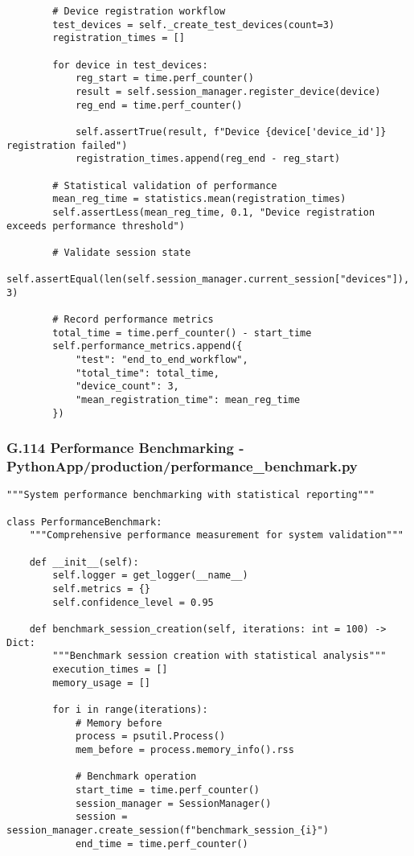 \documentclass[11pt,a4paper]{article}
\begin{document}
{{\begin{verbatim}
        # Device registration workflow
        test_devices = self._create_test_devices(count=3)
        registration_times = []

        for device in test_devices:
            reg_start = time.perf_counter()
            result = self.session_manager.register_device(device)
            reg_end = time.perf_counter()

            self.assertTrue(result, f"Device {device['device_id']} registration failed")
            registration_times.append(reg_end - reg_start)

        # Statistical validation of performance
        mean_reg_time = statistics.mean(registration_times)
        self.assertLess(mean_reg_time, 0.1, "Device registration exceeds performance threshold")

        # Validate session state
        self.assertEqual(len(self.session_manager.current_session["devices"]), 3)

        # Record performance metrics
        total_time = time.perf_counter() - start_time
        self.performance_metrics.append({
            "test": "end_to_end_workflow",
            "total_time": total_time,
            "device_count": 3,
            "mean_registration_time": mean_reg_time
        })
\end{verbatim}

\subsubsection{G.114 Performance Benchmarking - PythonApp/production/performance_benchmark.py}

\begin{verbatim}
"""System performance benchmarking with statistical reporting"""

class PerformanceBenchmark:
    """Comprehensive performance measurement for system validation"""

    def __init__(self):
        self.logger = get_logger(__name__)
        self.metrics = {}
        self.confidence_level = 0.95

    def benchmark_session_creation(self, iterations: int = 100) -> Dict:
        """Benchmark session creation with statistical analysis"""
        execution_times = []
        memory_usage = []

        for i in range(iterations):
            # Memory before
            process = psutil.Process()
            mem_before = process.memory_info().rss

            # Benchmark operation
            start_time = time.perf_counter()
            session_manager = SessionManager()
            session = session_manager.create_session(f"benchmark_session_{i}")
            end_time = time.perf_counter()


\end{verbatim}}}
\end{document}
